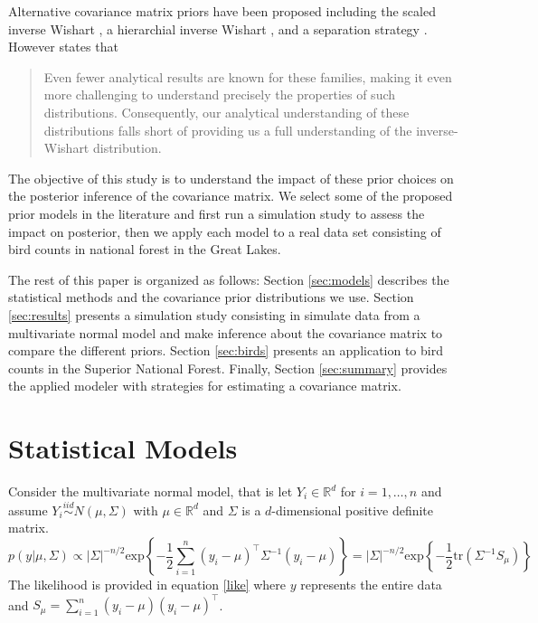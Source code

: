 \documentclass[12pt]{article}
\begin{document}
Alternative covariance matrix priors have been proposed including the scaled inverse Wishart \citep{odomain}, a hierarchial inverse Wishart \citep{huang2013simple}, and a separation strategy \citep{barnard2000}. However \citep{visualize} states that 
\begin{quote}
Even fewer analytical results are known for these families, making it even more challenging to understand precisely the properties of such distributions. Consequently, our analytical understanding of these distributions falls short of providing us a full understanding of the inverse-Wishart distribution.
 \end{quote}
 
The objective of this study is to understand the impact of these prior choices on the posterior inference of the covariance matrix. We select some of the proposed prior models in the literature and first run a simulation study to assess the impact on posterior, then we apply each model to a real data set consisting of bird counts in national forest in the Great Lakes. 

The rest of this paper is organized as follows: Section \ref{sec:models} describes the statistical methods and the covariance prior distributions we use. Section \ref{sec:results} presents a simulation study consisting in simulate data from a multivariate normal model and make inference about the covariance matrix to compare the different priors. Section \ref{sec:birds} presents an application to bird counts in the Superior National Forest. Finally, Section \ref{sec:summary} provides the applied modeler with strategies for estimating a covariance matrix. 

\section{Statistical Models \label{sec:models} }

Consider the multivariate normal model, that is let $Y_i\in \mathbb{R}^d$ for $i=1,\ldots,n$ and assume $Y_i \stackrel{iid}{\sim} N(\mu, \Sigma)$ with $\mu\in \mathbb{R}^d$ and $\Sigma$ is a $d$-dimensional positive definite matrix.   
  \begin{equation}
 p(y\vert \mu,\Sigma) \propto |\Sigma|^{-n/2} \mbox{exp}\left\{- \frac{1}{2} \sum_{i=1}^n (y_i-\mu)^\top \Sigma^{-1} (y_i-\mu) \right\} = |\Sigma|^{-n/2}  \mbox{exp}\left\{- \frac{1}{2}  \mbox{tr}(\Sigma^{-1}S_\mu)  \right\} 
 \label{like}
 \end{equation}
The likelihood is provided in equation \eqref{like} where $y$ represents the entire data and  $S_\mu = \sum_{i=1}^n (y_i-\mu) (y_i-\mu) ^\top$. 
\end{document}
